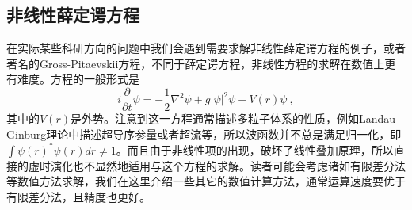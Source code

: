 
\begin{issues}
\issueTODO
\end{issues}

\subsection{非线性薛定谔方程}
在实际某些科研方向的问题中我们会遇到需要求解非线性薛定谔方程的例子，或者著名的Gross-Pitaevskii方程，不同于薛定谔方程，非线性方程的求解在数值上更有难度。方程的一般形式是
\begin{equation}
i \frac{\partial}{\partial t} \psi = -\frac{1}{2}\nabla^2 \psi + g |\psi|^2 \psi + V(r)\psi~,
\end{equation}
其中的$V(r)$是外势。注意到这一方程通常描述多粒子体系的性质，例如Landau-Ginburg理论中描述超导序参量或者超流等，所以波函数并不总是满足归一化，即$\int \psi(r)^*\psi(r) dr \neq 1$。而且由于非线性项的出现，破坏了线性叠加原理，所以直接的虚时演化也不显然地适用与这个方程的求解。读者可能会考虑诸如有限差分法等数值方法求解，我们在这里介绍一些其它的数值计算方法，通常运算速度要优于有限差分法，且精度也更好。

